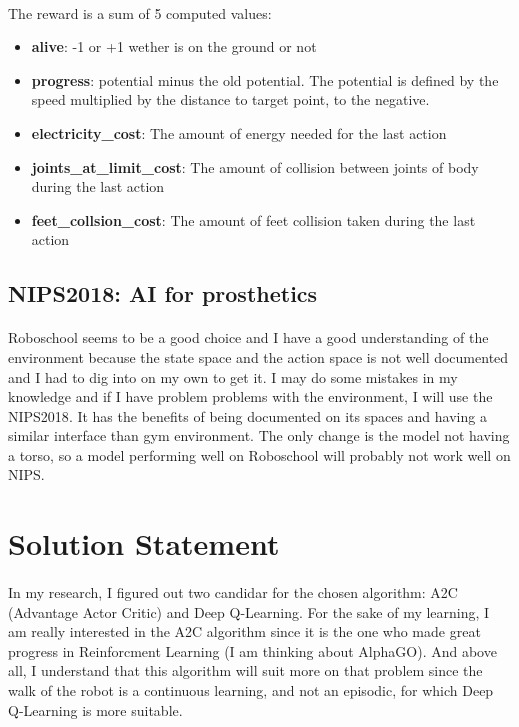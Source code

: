 \documentclass{article}
\begin{document}
\paragraph{}
The reward is a sum of 5 computed values: \begin{itemize}
  \item{\textbf{alive}: -1 or +1 wether is on the ground or not}
  \item{\textbf{progress}: potential minus the old potential. The potential is defined by
    the speed multiplied by the distance to target point, to the negative.}
  \item{\textbf{electricity\_cost}: The amount of energy needed for the last action}
  \item{\textbf{joints\_at\_limit\_cost}: The amount of collision between joints of body
      during the last action}
  \item{\textbf{feet\_collsion\_cost}: The amount of feet collision taken during the last action}
  \end{itemize}

  \subsection{NIPS2018: AI for prosthetics}
  \paragraph{}
  Roboschool seems to be a good choice and I have a good understanding of the
  environment because the state space and the action space is not well documented
  and I had to dig into on my own to get it. I may do some mistakes in my
  knowledge and if I have problem problems with the environment, I will use the
  NIPS2018\cite{kidzinski2018learningtorun}. It has the benefits of being
  documented on its spaces and having a similar interface than gym
  environment. The only change is the model not having a torso, so a model
  performing well on Roboschool will probably not work well on NIPS.
  
	\section{Solution Statement}
  \paragraph{}
  In my research, I figured out two candidar for the chosen algorithm: A2C (Advantage Actor Critic) and Deep Q-Learning. For the sake of my learning, I am really interested in the A2C algorithm since
  it is the one who made great progress in Reinforcment Learning (I am thinking
  about AlphaGO\cite{silver2017mastering}). And above all, I understand that this
  algorithm will suit more on that problem since the walk of the robot is a
  continuous learning, and not an episodic, for which Deep Q-Learning is more
  suitable.
  
\end{document}
